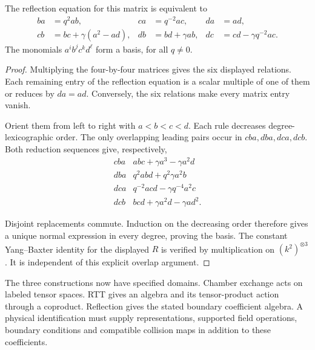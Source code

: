 \begin{proposition}
\label{prop:alg-reflection-pbw}
The reflection equation for this matrix is equivalent to
\begin{align*}
 ba&=q^2ab,&ca&=q^{-2}ac,&da&=ad,\\
 cb&=bc+\gamma(a^2-ad),&
 db&=bd+\gamma ab,&
 dc&=cd-\gamma q^{-2}ac.
\end{align*}
The monomials $a^i b^j c^k d^\ell$ form a basis, for all $q\ne0$.
\end{proposition}
\begin{proof}
Multiplying the four-by-four matrices gives the six displayed relations. Each remaining entry of the reflection equation is a scalar multiple of one of them or reduces by $da=ad$.
Conversely, the six relations make every matrix entry vanish.

Orient them from left to right with $a<b<c<d$.
Each rule decreases degree-lexicographic order.
The only overlapping leading pairs occur in $cba,dba,dca,dcb$.
Both reduction sequences give, respectively,
\[
\begin{array}{c|l}
 cba&abc+\gamma a^3-\gamma a^2d\\
 dba&q^2abd+q^2\gamma a^2b\\
 dca&q^{-2}acd-\gamma q^{-4}a^2c\\
 dcb&bcd+\gamma a^2d-\gamma ad^2.
\end{array}
\]

Disjoint replacements commute.
Induction on the decreasing order therefore gives a unique normal expression in every degree, proving the basis.
The constant Yang--Baxter identity for the displayed $R$ is verified by multiplication on $(k^2)^{\otimes3}$. It is independent of this explicit overlap argument.
\end{proof}

The three constructions now have specified domains.
Chamber exchange acts on labeled tensor spaces.
RTT gives an algebra and its tensor-product action through a coproduct.
Reflection gives the stated boundary coefficient algebra.
A physical identification must supply representations, supported field operations, boundary conditions and compatible collision maps in addition to these coefficients.
